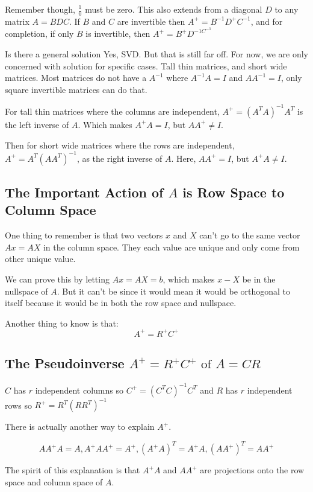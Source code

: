  Remember though, \(\frac{1}{0}\) must be zero. This also extends from a diagonal \(D\) to any matrix \(A = BDC\). If \(B\) and \(C\) are invertible then \(A^+ = B^{-1} D^+ C^{-1}\), and for completion, if only \(B\) is invertible, then \(A^+ = B^+ D^{-1 C^{-1} } \)       

 Is there a general solution Yes, SVD. But that is still far off. For now, we are only concerned with solution for specific cases. Tall thin matrices, and short wide matrices. Most matrices do not have a \(A^{-1} \) where \(A^{-1} A = I \) and \(A A^{-1} = I \), only square invertible matrices can do that.

 For tall thin matrices where the columns are independent, \(A^+ = (A^T A)^{-1} A^T \) is the left inverse of \(A\). Which makes \(A^+ A = I\), but \(A A^+ \neq I\). 
 
 Then for short wide matrices where the rows are independent, \(A^+ = A^T (A A^T)^{-1} \), as the right inverse of \(A\). Here, \(A A^+ = I\), but \(A^+ A \neq I\).  

\subsection{The Important Action of \(A\) is Row Space to Column Space }

One thing to remember is that two vectors \(x\) and \(X\) can't go to the same vector \(Ax = AX\) in the column space. They each value are unique and only come from other unique value. 

We can prove this by letting \(Ax = AX = b\), which makes \(x - X\) be in the nullspace of \(A\). But it can't be since it would mean it would be orthogonal to itself because it would be in both the row space and nullspace. 

Another thing to know is that: 
\[
    A^+ = R^+ C^+
\]

\subsection{The Pseudoinverse \(A^+ = R^+ C^+ \text{ of } A = CR\) }

\(C\) has \(r\) independent columns so \(C^+ = (C^T C)^{-1} C^T\) and \(R\) has \(r\) independent rows so \(R^+ = R^T(R R^T)^{-1} \)

There is actually another way to explain \(A^+\). 

\[
    A A^+ A = A, A^+ A A^+ = A^+, (A^+ A)^T = A^+ A, (A A^+)^T = A A^+
\]

The spirit of this explanation is that \(A^+ A\) and \(A A^+\) are projections onto the row space and column space of \(A\). 

